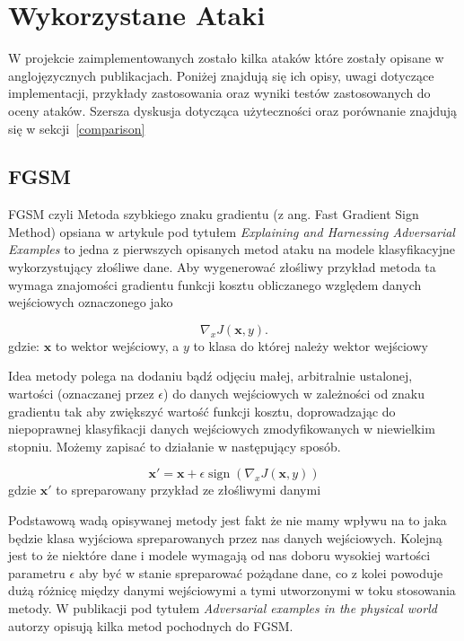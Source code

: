 \documentclass[
    left=2.5cm,         %
    right=2.5cm,        %
    top=2.5cm,          %
    bottom=3cm,         %
    bindingoffset=6mm,  %
    nohyphenation=false %
]{eiti/eiti-thesis}
\renewcommand{\vec}[1]{\mathbf{#1}}
\begin{document}
\newpage



\section{Wykorzystane Ataki}
W projekcie zaimplementowanych zostało kilka ataków które zostały opisane w anglojęzycznych publikacjach.
Poniżej znajdują się ich opisy, uwagi dotyczące implementacji, przykłady zastosowania oraz wyniki testów
zastosowanych do oceny ataków. Szersza dyskusja dotycząca użyteczności oraz porównanie znajdują się w sekcji~\ref{comparison}

\subsection{FGSM}
    FGSM czyli Metoda szybkiego znaku gradientu (z ang. Fast Gradient Sign Method) opsiana w artykule
    pod tytułem \textit{Explaining and Harnessing Adversarial Examples}\cite{harnessing} to jedna z pierwszych
    opisanych metod ataku na modele klasyfikacyjne wykorzystujący złośliwe dane.
    Aby wygenerować złośliwy przykład metoda ta wymaga znajomości gradientu funkcji kosztu obliczanego względem danych
    wejściowych oznaczonego jako

    \begin{equation}
        \nabla_{x} J(\vec{x}, y).
    \end{equation}
    gdzie: $\vec{x}$ to wektor wejściowy, a $y$ to klasa do której należy wektor wejściowy

    Idea metody polega na dodaniu bądź odjęciu małej, arbitralnie ustalonej, wartości (oznaczanej przez \(\epsilon\)) do
    danych wejściowych w zależności od znaku gradientu tak aby zwiększyć wartość funkcji kosztu,
    doprowadzając do niepoprawnej klasyfikacji danych wejściowych zmodyfikowanych w niewielkim stopniu.
    Możemy zapisać to działanie w następujący sposób.

    \begin{equation}
    \vec{x'} = \vec{x} + \epsilon\operatorname{sign}(\nabla_{x} J(\vec{x}, y))
    \end{equation}
    gdzie $\vec{x'}$ to spreparowany przykład ze złośliwymi danymi


    Podstawową wadą opisywanej metody jest fakt że nie mamy wpływu na to jaka będzie klasa wyjściowa
    spreparowanych przez nas danych wejściowych. Kolejną jest to że niektóre dane i modele wymagają od nas
    doboru wysokiej wartości parametru $\epsilon$ aby być w stanie spreparować pożądane dane, co z kolei powoduje dużą
    różnicę między danymi wejściowymi a tymi utworzonymi w toku stosowania metody.
    W publikacji pod tytułem \textit{Adversarial examples in the physical world}\cite{DBLP:journals/corr/KurakinGB16}
    autorzy opisują kilka metod pochodnych do FGSM.
\end{document}
